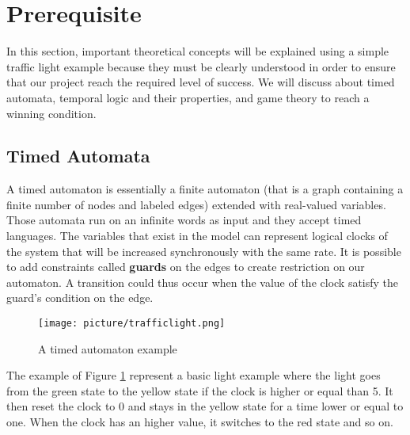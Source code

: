 \section{Prerequisite}
In this section, important theoretical concepts will be explained using a simple traffic light example because they must be clearly understood in order to ensure that our project reach the required level of success. We will discuss about timed automata, temporal logic and their properties, and game theory to reach a winning condition.

\subsection{Timed Automata} \label{sec:automate}
A timed automaton is essentially a finite automaton (that is a graph
containing a finite number of nodes and labeled edges) extended with real-valued variables. Those automata run on an infinite words as input and they accept timed languages. The variables that exist in the model can represent logical clocks of the system that will be increased synchronously with the same rate.
It is possible to add constraints called \textbf{guards} on the edges to create restriction on our automaton. A transition could thus occur when the value of the clock satisfy the guard's condition on the edge.

\begin{figure}[!ht]\label{fig:timed}
  \centering
    \texttt{[image: picture/trafficlight.png]}
    \caption{A timed automaton example}
\end{figure}

The example of Figure \ref{fig:timed} represent a basic light example where the light goes from the green state to the yellow state if the clock is higher or equal than 5. It then reset the clock to 0 and stays in the yellow state for a time lower or equal to one. When the clock has an higher value, it switches to the red state and so on.


